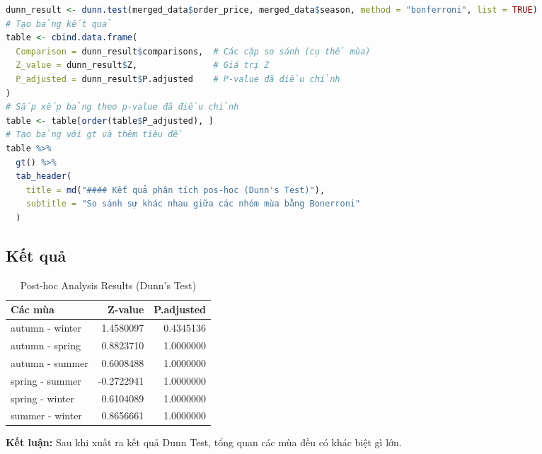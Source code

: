 \begin{lstlisting}[language=R,caption=Thực hiện phân tích Pos Hoc trong R]
dunn_result <- dunn.test(merged_data$order_price, merged_data$season, method = "bonferroni", list = TRUE)
# Tạo bảng kết quả
table <- cbind.data.frame(
  Comparison = dunn_result$comparisons,  # Các cặp so sánh (cụ thể mùa)
  Z_value = dunn_result$Z,               # Giá trị Z
  P_adjusted = dunn_result$P.adjusted    # P-value đã điều chỉnh
)
# Sắp xếp bảng theo p-value đã điều chỉnh
table <- table[order(table$P_adjusted), ]
# Tạo bảng với gt và thêm tiêu đề
table %>%
  gt() %>%
  tab_header(
    title = md("#### Kết quả phân tích pos-hoc (Dunn's Test)"),
    subtitle = "So sánh sự khác nhau giữa các nhóm mùa bằng Bonerroni"
  )

\end{lstlisting}
\subsection{Kết quả}

\begin{table}[H]
\centering
\begin{tabular}{|l|r|r|} %
\hline
\textbf{Các mùa} & \textbf{Z-value} & \textbf{P.adjusted} \\ \hline
autumn - winter     & 1.4580097        & 0.4345136           \\ \hline
autumn - spring     & 0.8823710        & 1.0000000           \\ \hline
autumn - summer     & 0.6008488        & 1.0000000           \\ \hline
spring - summer     & -0.2722941       & 1.0000000           \\ \hline
spring - winter     & 0.6104089        & 1.0000000           \\ \hline
summer - winter     & 0.8656661        & 1.0000000           \\ \hline
\end{tabular}
\caption{Post-hoc Analysis Results (Dunn's Test)}
\label{tab:dunn_results}
\end{table}

    \textbf{Kết luận:}
    Sau khi xuất ra kết quả Dunn Test, tổng quan các mùa đều có khác biệt gì lớn.

